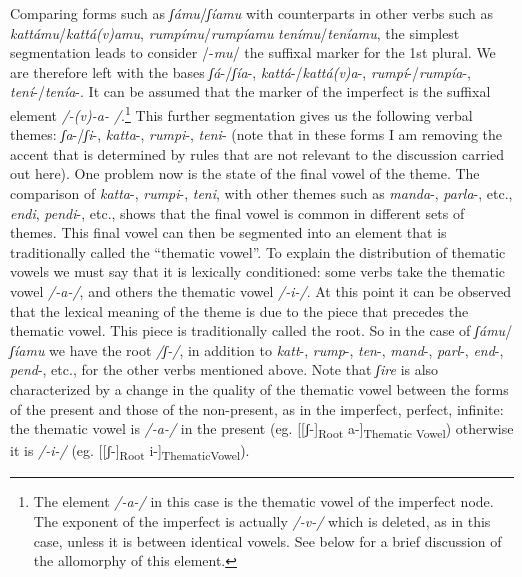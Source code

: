 \documentclass[output=paper]{langscibook}
\begin{document}
Comparing forms such as \textit{ʃámu}/\textit{ʃíamu} with counterparts in other verbs such as \textit{kattámu}/\textit{kattá(v)amu}, \textit{rumpímu}/\textit{rumpíamu} \textit{tenímu}/\textit{teníamu}, the simplest segmentation leads to consider /-\textit{mu}/ the suffixal marker for the 1st plural. We are therefore left with the bases  \textit{ʃá}-/\textit{ʃía}-, \textit{kattá}-/\textit{kattá(v)a}-, \textit{rumpí}-/\textit{rumpía}-, \textit{tení}-/\textit{tenía}-.  It can be assumed that the marker of the imperfect is  the suffixal element \textit{/-(v)-a- /}.\footnote{The element \textit{/-a-/} in this case is the thematic vowel of the imperfect node.  The exponent of the imperfect is actually \textit{/-v-/} which is deleted, as in this case, unless it is between identical vowels.  See below for a brief discussion of the allomorphy of this element.} This further segmentation gives us the following verbal themes:  \textit{ʃa}-/\textit{ʃi}-, \textit{katta}-, \textit{rumpi}-, \textit{teni}-  (note that in these forms I am removing the accent that is determined by rules that are not relevant to the discussion carried out here). One problem now is the state of the final vowel of the theme. The comparison of \textit{katta}-, \textit{rumpi}-, \textit{teni}, with other themes such as \textit{manda}-, \textit{parla}-, etc., \textit{endi}, \textit{pendi}-,  etc., shows that the final vowel is common in different sets of  themes.  This final vowel can then be segmented into an element that is traditionally called  the “thematic vowel”. To explain the distribution of thematic vowels we must say that it is lexically  conditioned:  some verbs take the thematic  vowel  \textit{/-a-/}, and others the thematic vowel  \textit{/-i-/}. At this point it can be observed that the lexical meaning of the  theme  is  due to the piece that precedes the thematic vowel. This piece is traditionally called the root. So in the case of \textit{ʃámu}/\textit{ʃíamu}  we have the root \textit{/ʃ-/}, in addition to \textit{katt}-, \textit{rump}-, \textit{ten}-, \textit{mand}-, \textit{parl}-, \textit{end}-, \textit{pend}-, etc.,  for the other verbs mentioned above.  Note that  \textit{ʃire}  is also characterized by a change in the quality of the thematic vowel between the forms of the present and those of the non-present, as in the imperfect, perfect, infinite: the thematic vowel is \textit{/-a-/} in the present  (eg. [[ʃ-]\textsubscript{Root}  a-]\textsubscript{Thematic Vowel}) otherwise it is  \textit{/-i-/} (eg. [[ʃ-]\textsubscript{Root}  i-]\textsubscript{ThematicVowel}).
\end{document}
